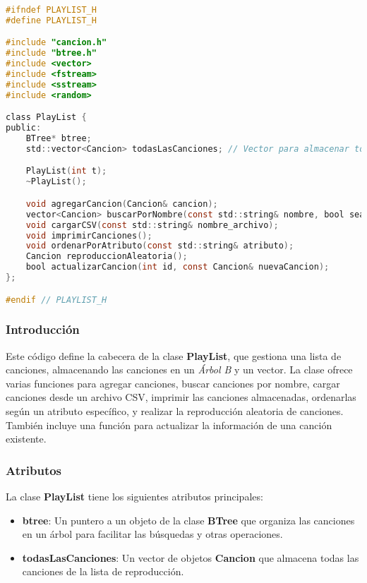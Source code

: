 \documentclass[12pt]{article}
\begin{document}
\begin{flushleft}
            \begin{lstlisting}[language=C, style=mystyle, caption={Cabecera de la Clase Playlist}]
#ifndef PLAYLIST_H
#define PLAYLIST_H

#include "cancion.h"
#include "btree.h"
#include <vector>
#include <fstream>
#include <sstream>
#include <random>

class PlayList {
public:
    BTree* btree;
    std::vector<Cancion> todasLasCanciones; // Vector para almacenar todas las canciones

    PlayList(int t);
    ~PlayList();

    void agregarCancion(Cancion& cancion);
    vector<Cancion> buscarPorNombre(const std::string& nombre, bool searchByArtist);
    void cargarCSV(const std::string& nombre_archivo);
    void imprimirCanciones();
    void ordenarPorAtributo(const std::string& atributo);
    Cancion reproduccionAleatoria();
    bool actualizarCancion(int id, const Cancion& nuevaCancion);
};

#endif // PLAYLIST_H
            \end{lstlisting}
            \subsubsection{Introducción}
            
                \noindent\hspace*{4em}Este código define la cabecera de la clase \textbf{PlayList}, que gestiona una lista de canciones, almacenando las canciones en un \textit{Árbol B} y un vector. La clase ofrece varias funciones para agregar canciones, buscar canciones por nombre, cargar canciones desde un archivo CSV, imprimir las canciones almacenadas, ordenarlas según un atributo específico, y realizar la reproducción aleatoria de canciones. También incluye una función para actualizar la información de una canción existente.
            
            \subsubsection{Atributos}
            
                \noindent\hspace*{4em}La clase \textbf{PlayList} tiene los siguientes atributos principales:
                
                \begin{itemize}[left=4em]
                    \item \textbf{btree}: Un puntero a un objeto de la clase \textbf{BTree} que organiza las canciones en un árbol para facilitar las búsquedas y otras operaciones.
                    \item \textbf{todasLasCanciones}: Un vector de objetos \textbf{Cancion} que almacena todas las canciones de la lista de reproducción.
                \end{itemize}
            

\end{flushleft}
\end{document}
